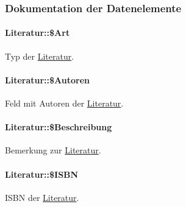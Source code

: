 \subsubsection{Dokumentation der Datenelemente}
\hypertarget{classLiteratur_fb4d4b1ce29a33a10e3e27d47f31a447}{
\paragraph[\$Art]{\setlength{\rightskip}{0pt plus 5cm}Literatur::\$Art}\hfill}
\label{classLiteratur_fb4d4b1ce29a33a10e3e27d47f31a447}


Typ der \hyperlink{classLiteratur}{Literatur}. 

\hypertarget{classLiteratur_01b311917d78c1dbb346435598ebba64}{
\paragraph[\$Autoren]{\setlength{\rightskip}{0pt plus 5cm}Literatur::\$Autoren}\hfill}
\label{classLiteratur_01b311917d78c1dbb346435598ebba64}


Feld mit Autoren der \hyperlink{classLiteratur}{Literatur}. 

\hypertarget{classLiteratur_6769ff8b353d2f789125f009b4dcfdc0}{
\paragraph[\$Beschreibung]{\setlength{\rightskip}{0pt plus 5cm}Literatur::\$Beschreibung}\hfill}
\label{classLiteratur_6769ff8b353d2f789125f009b4dcfdc0}


Bemerkung zur \hyperlink{classLiteratur}{Literatur}. 

\hypertarget{classLiteratur_9e3b00766297a68adac423980767dd3c}{
\paragraph[\$ISBN]{\setlength{\rightskip}{0pt plus 5cm}Literatur::\$ISBN}\hfill}
\label{classLiteratur_9e3b00766297a68adac423980767dd3c}


ISBN der \hyperlink{classLiteratur}{Literatur}. 

